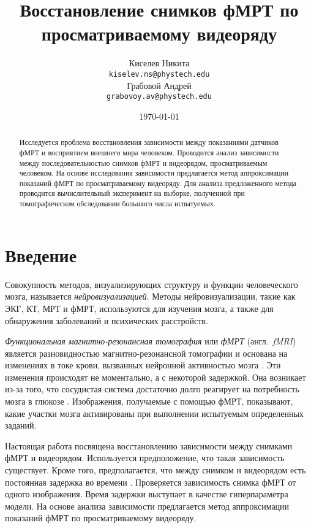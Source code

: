 \documentclass[a4paper, 12pt]{article}
\title{Восстановление снимков фМРТ по просматриваемому видеоряду}
\author{
	Киселев Никита \\
	\texttt{kiselev.ns@phystech.edu} \\
	\And
	Грабовой Андрей \\
	\texttt{grabovoy.av@phystech.edu}
}
\date{\today}
\begin{document}
\maketitle

\begin{abstract}
	
	Исследуется проблема восстановления зависимости между показаниями датчиков фМРТ
	и восприятием внешнего мира человеком.
	Проводится анализ зависимости между последовательностью снимков фМРТ и видеорядом,
	просматриваемым человеком.
	На основе исследования зависимости предлагается метод аппроксимации показаний фМРТ по
	просматриваемому видеоряду.
	Для анализа предложенного метода проводится вычислительный эксперимент на 
	выборке, полученной при томографическом обследовании большого числа испытуемых.

\end{abstract}



\section{Введение}

	Совокупность методов, визуализирующих структуру и функции человеческого мозга,
	называется \textit{нейровизуализацией}. Методы нейровизуализации, такие как ЭКГ, КТ, МРТ и фМРТ, 
	используются для изучения мозга, а также для обнаружения заболеваний и психических расстройств. 

	\textit{Функциональная магнитно-резонансная томография} или \textit{фМРТ} (англ.~\textit{fMRI}) 
	является разновидностью магнитно-резонансной томографии и основана на изменениях в токе крови, 
	вызванных нейронной активностью мозга \citep{Glover2011}. 
	Эти изменения происходят не моментально, а с некоторой задержкой.
	Она возникает из-за того, что сосудистая система достаточно долго реагирует 
	на потребность мозга в глюкозе \citep{Logothetis2003}. Изображения, получаемые с помощью фМРТ,
	показывают, какие участки мозга активированы при выполнении испытуемым определенных заданий.

	Настоящая работа посвящена восстановлению зависимости между снимками фМРТ и видеорядом.
	Используется предположение, что такая зависимость существует.
	Кроме того, предполагается, что между снимком и видеорядом есть постоянная задержка во времени
	\citep{Logothetis2003}.
	Проверяется зависимость снимка фМРТ от одного изображения.
	Время задержки выступает в качестве гиперпараметра модели.
	На основе анализа зависимости предлагается метод аппроксимации показаний фМРТ по
	просматриваемому видеоряду.
\end{document}
